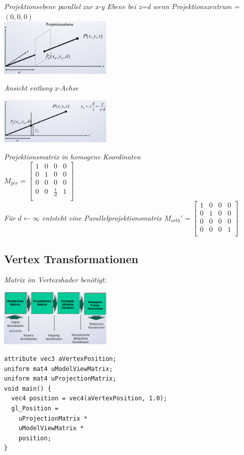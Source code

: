 \textit{Projektionsebene parallel zur x-y Ebene bei z=d wenn Projektionszentrum = $(0,0,0)$} \\

\includegraphics[width=0.4\textwidth]{assets/viewing-projektionsebene.png}

\textit{Ansicht entlang x-Achse}

\includegraphics[width=0.4\textwidth]{assets/viewing-projektionsebene-xachse.png}

\textit{Projektionsmatrix in homogene Koordinaten}\\
$M_{per} = \begin{bmatrix}
    1 & 0 & 0 & 0 \\
    0 & 1 & 0 & 0 \\
    0 & 0 & 0 & 0 \\
    0 & 0 & \frac{1}{d} & 1 \\
\end{bmatrix}$\\

\textit{Für $d \leftarrow \infty$ entsteht eine Parallelprojektionsmatrix}
$M_{orth}' = \begin{bmatrix}
    1 & 0 & 0 & 0 \\
    0 & 1 & 0 & 0 \\
    0 & 0 & 0 & 0 \\
    0 & 0 & 0 & 1 \\
\end{bmatrix}$

\subsection{Vertex Transformationen}

\textit{Matrix im Vertexshader benötigt:}

\includegraphics[width=0.4\textwidth]{assets/vertex-transformation.png}

\begin{lstlisting}
attribute vec3 aVertexPosition;
uniform mat4 uModelViewMatrix;
uniform mat4 uProjectionMatrix;
void main() {
  vec4 position = vec4(aVertexPosition, 1.0);
  gl_Position =
    uProjectionMatrix *
    uModelViewMatrix *
    position;
}
\end{lstlisting}


